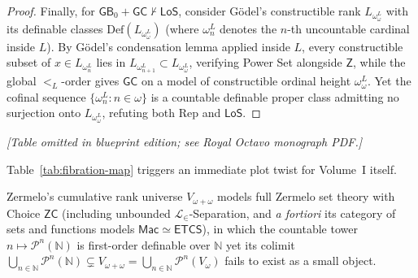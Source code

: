 \begin{proof}
Finally, for $\mathsf{GB}_0 + \mathsf{GC} \not\vdash \mathsf{LoS}$, consider G\"odel's constructible rank $L_{\omega_\omega^L}$ with its definable classes $\mathrm{Def}(L_{\omega_\omega^L})$ (where $\omega_n^L$ denotes the $n$-th uncountable cardinal inside $L$). By G\"odel's condensation lemma applied inside $L$, every constructible subset of $x \in L_{\omega_n^L}$ lies in $L_{\omega_{n+1}^L} \subset L_{\omega_\omega^L}$, verifying Power Set alongside $\mathsf{Z}$, while the global $<_L$-order gives $\mathsf{GC}$ on a model of constructible ordinal height $\omega_\omega^L$. Yet the cofinal sequence $\{\omega_n^L : n \in \omega\}$ is a countable definable proper class admitting no surjection onto $L_{\omega_\omega^L}$, refuting both $\mathrm{Rep}$ and $\mathsf{LoS}$.
\end{proof}

\begin{center}\emph{[Table omitted in blueprint edition; see Royal Octavo monograph PDF.]}\label{tab:fibration-map}\end{center}

Table~\ref{tab:fibration-map} triggers an immediate plot twist for Volume~I itself.

\begin{proposition}\label{prop:etcs-colimit-escape}%
%
Zermelo's cumulative rank universe $V_{\omega+\omega}$ models full Zermelo set theory with Choice $\mathsf{ZC}$ (including unbounded $\mathcal{L}_\in$-Separation, and \emph{a fortiori} its category of sets and functions models $\mathsf{Mac} \simeq \mathsf{ETCS}$), in which the countable tower $n \mapsto \mathcal{P}^n(\mathbb{N})$ is first-order definable over $\mathbb{N}$ yet its colimit $\bigcup_{n \in \mathbb{N}} \mathcal{P}^n(\mathbb{N}) \subsetneq V_{\omega+\omega} = \bigcup_{n \in \mathbb{N}} \mathcal{P}^n(V_\omega)$ fails to exist as a small object.
\end{proposition}

